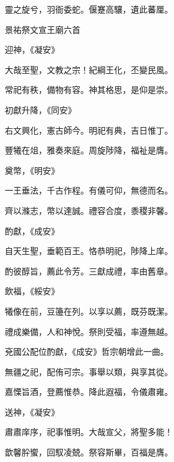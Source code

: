 \begin{pinyinscope}
 靈之旋兮，羽衙委蛇。偃蹇高驤，遺此蕃厘。



 景祐祭文宣王廟六首



 迎神，《凝安》



 大哉至聖，文教之宗！紀綱王化，丕變民風。



 常祀有秩，備物有容。神其格思，是仰是崇。



 初獻升降，《同安》



 右文興化，憲古師今。明祀有典，吉日惟丁。



 豐犧在俎，雅奏來庭。周旋陟降，福祉是膺。



 奠幣，《明安》



 一王垂法，千古作程。有儀可仰，無德而名。



 齊以滌志，幣以達誠。禮容合度，黍稷非馨。



 酌獻，《成安》



 自天生聖，垂範百王。恪恭明祀，陟降上庠。



 酌彼醇旨，薦此令芳。三獻成禮，率由舊章。



 飲福，《綏安》



 犧像在前，豆籩在列。以享以薦，既芬既潔。



 禮成樂備，人和神悅。祭則受福，率遵無越。



 兗國公配位酌獻，《成安》哲宗朝增此一曲。



 無疆之祀，配侑可宗。事舉以類，與享其從。



 嘉慄旨酒，登薦惟恭。降此遐福，令儀肅雍。



 送神，《凝安》



 肅肅庠序，祀事惟明。大哉宣父，將聖多能！



 歆馨肸蠁，回馭凌兢。祭容斯畢，百福是膺。




\end{pinyinscope}
